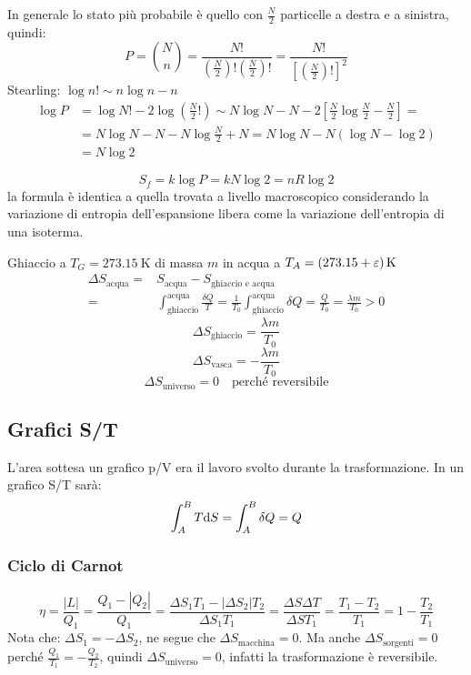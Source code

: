 In generale lo stato più probabile è quello con $\frac{N}{2}$ particelle a destra e a sinistra, quindi:
\[P=\binom{N}{n}=\frac{N!}{\left(\frac{N}{2}\right)!\left(\frac{N}{2}\right)!}=\frac{N!}{\left[\left(\frac{N}{2}\right)!\right]^2}\]
Stearling: $\log n!\sim n\log n-n$
\begin{align*}
   \log P & =\log N!-2\log\left(\frac{N}{2}!\right)\sim N\log N-N-2\left[\frac{N}{2}\log\frac{N}{2}-\frac{N}{2}\right]= \\
          & =N\log N-N-N\log\frac{N}{2}+N=N\log N-N\left(\log N-\log 2\right)                                           \\
          & =N\log 2
\end{align*}

\[S_f=k\log P=kN\log 2=nR\log 2\]
la formula è identica a quella trovata a livello macroscopico considerando la variazione di entropia dell'espansione libera come la variazione dell'entropia di una isoterma.

\begin{Es}
   Ghiaccio a $T_G=\SI{273.15}{\kelvin}$ di massa $m$ in acqua a $T_A=\SI[parse-numbers = false]{(273.15+\varepsilon)}{\kelvin}$
   \begin{align*}
      \Delta S_\text{acqua}= & S_\text{acqua}-S_\text{ghiaccio e acqua}                                                                                                         \\
      =                      & \int_\text{ghiaccio}^\text{acqua}\frac{\delta Q}{T}=\frac{1}{T_0}\int_\text{ghiaccio}^\text{acqua}\delta Q=\frac{Q}{T_0}=\frac{\lambda m}{T_0}>0
   \end{align*}
   \[\Delta S_\text{ghiaccio}=\frac{\lambda m}{T_0}\]
   \[\Delta S_\text{vasca}=-\frac{\lambda m}{T_0}\]
   \[\Delta S_\text{universo}=0\quad\text{perché reversibile}\]
\end{Es}
\subsection{Grafici S/T}
L'area sottesa un grafico p/V era il lavoro svolto durante la trasformazione. In un grafico S/T sarà:
\[\int_A^B T\mathrm{d} S=\int_A^B\delta Q=Q\]
\subsubsection{Ciclo di Carnot}
\[\eta=\frac{|L|}{Q_1}=\frac{Q_1-|Q_2|}{Q_1}=\frac{\Delta S_1T_1-|\Delta S_2| T_2}{\Delta S_1 T_1}=\frac{\Delta S\Delta T}{\Delta S T_1}=\frac{T_1-T_2}{T_1}=1-\frac{T_2}{T_1}\]
Nota che: $\Delta S_1=-\Delta S_2$, ne segue che $\Delta S_\text{macchina}=0$. Ma anche \mbox{$\Delta S_\text{sorgenti}=0$} perché $\frac{Q_1}{T_1}=-\frac{Q_2}{T_2}$, quindi $\Delta S_\text{universo}=0$, infatti la trasformazione è reversibile.

